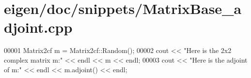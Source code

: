 \hypertarget{eigen_2doc_2snippets_2_matrix_base__adjoint_8cpp_source}{}\section{eigen/doc/snippets/\+Matrix\+Base\+\_\+adjoint.cpp}
\label{eigen_2doc_2snippets_2_matrix_base__adjoint_8cpp_source}

\begin{DoxyCode}
00001 Matrix2cf m = Matrix2cf::Random();
00002 cout << \textcolor{stringliteral}{"Here is the 2x2 complex matrix m:"} << endl << m << endl;
00003 cout << \textcolor{stringliteral}{"Here is the adjoint of m:"} << endl << m.adjoint() << endl;
\end{DoxyCode}
